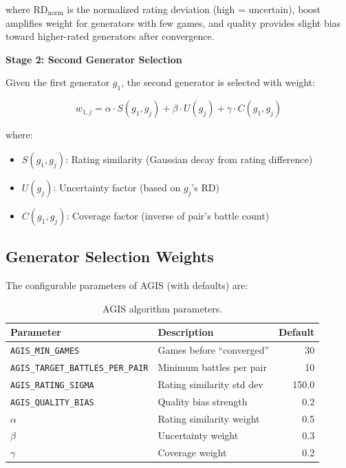 \documentclass[11pt,a4paper]{article}
\theoremstyle{plain}
\theoremstyle{definition}
\theoremstyle{remark}
\begin{document}
where $\text{RD}_{\text{norm}}$ is the normalized rating deviation (high = uncertain), $\text{boost}$ amplifies weight for generators with few games, and $\text{quality}$ provides slight bias toward higher-rated generators after convergence.

\textbf{Stage 2: Second Generator Selection}

Given the first generator $g_1$, the second generator is selected with weight:

\begin{equation}
w_{1,j} = \alpha \cdot S(g_1, g_j) + \beta \cdot U(g_j) + \gamma \cdot C(g_1, g_j)
\end{equation}

where:
\begin{itemize}
    \item $S(g_1, g_j)$: Rating similarity (Gaussian decay from rating difference)
    \item $U(g_j)$: Uncertainty factor (based on $g_j$'s RD)
    \item $C(g_1, g_j)$: Coverage factor (inverse of pair's battle count)
\end{itemize}

\subsection{Generator Selection Weights}
\label{subsec:selection-weights}

The configurable parameters of AGIS (with defaults) are:

\begin{table}[H]
\centering
\begin{tabular}{llr}
\toprule
\textbf{Parameter} & \textbf{Description} & \textbf{Default} \\
\midrule
\texttt{AGIS\_MIN\_GAMES} & Games before ``converged'' & 30 \\
\texttt{AGIS\_TARGET\_BATTLES\_PER\_PAIR} & Minimum battles per pair & 10 \\
\texttt{AGIS\_RATING\_SIGMA} & Rating similarity std dev & 150.0 \\
\texttt{AGIS\_QUALITY\_BIAS} & Quality bias strength & 0.2 \\
\midrule
$\alpha$ & Rating similarity weight & 0.5 \\
$\beta$ & Uncertainty weight & 0.3 \\
$\gamma$ & Coverage weight & 0.2 \\
\bottomrule
\end{tabular}
\caption{AGIS algorithm parameters.}
\label{tab:agis-params}
\end{table}
\end{document}
